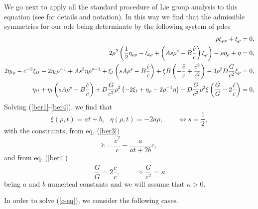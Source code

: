 \documentclass{revtex4}
\begin{document}
We go next to apply all the standard procedure of Lie group analysis
to this equation (see \cite{Ibragimov} for details and notation). In this
way we find that the admissible symmetries for our ode being determinate by
the following system of pdes
\begin{align}
\rho \xi _{\rho \rho }+\xi _{\rho }& =0,  \label{ber1} \\
2\rho ^{2}\left( \frac{1}{2}\eta _{\rho \rho }-\xi _{t\rho }+\left( As\rho
^{s}-B\frac{\dot{c}}{c}\right) \xi _{\rho }\right) -\rho \eta _{\rho }+\eta
& =0,  \label{ber1_1} \\
2\eta _{t\rho }-c^{-2}\xi _{tt}-2\eta _{t}\rho ^{-1}+As^{2}\eta \rho
^{s-1}+\xi _{t}\left( sA\rho ^{s}-B\frac{\dot{c}}{c}\right) +\xi B\left( -%
\frac{\ddot{c}}{c}+\frac{\dot{c}^{2}}{c^{2}}\right) -3\rho ^{2}D\frac{G}{%
c^{2}}\xi _{\rho }& =0,  \label{ber3} \\
\eta _{tt}+\eta _{t}\left( sA\rho ^{s}-B\frac{\dot{c}}{c}\right) +D\frac{G}{%
c^{2}}\rho ^{2}\left( -2\xi _{t}+\eta _{\rho }-2\rho ^{-1}\eta \right) -D%
\frac{G}{c^{2}}\rho ^{2}\xi \left( \frac{\dot{G}}{G}-2\frac{\dot{c}}{c}%
\right) & =0,  \label{ber4}
\end{align}
Solving (\ref{ber1}-\ref{ber4}), we find that
\begin{equation}
\xi (\rho ,t)=at+b,\text{\ \ \ \ \ \ \ \ }\eta (\rho ,t)=-2a\rho ,\qquad
\Longleftrightarrow s=\frac{1}{2},
\end{equation}
with the constraints, from eq. (\ref{ber3})
\begin{equation}
\ddot{c}=\frac{\dot{c}^{2}}{c}-\frac{a}{at+2b}\dot{c},  \label{c-eq}
\end{equation}
and from eq. (\ref{ber4})
\begin{equation}
\frac{\dot{G}}{G}=2\frac{\dot{c}}{c},\qquad \Longrightarrow \frac{G}{c^{2}}%
=\kappa
\end{equation}
being $a$ and $b$ numerical constants and we will assume that $\kappa >0$.

In order to solve (\ref{c-eq}), we consider the following cases.
\end{document}

